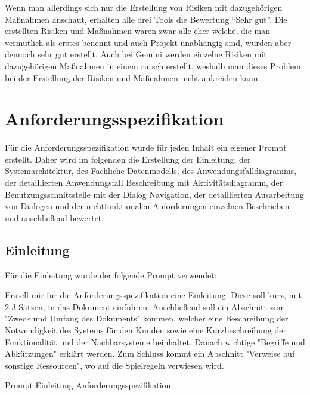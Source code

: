 Wenn man allerdings sich nur die Erstellung von Risiken mit dazugehörigen Maßnahmen anschaut, erhalten alle drei Tools die Bewertung 
``Sehr gut''. Die erstellten Risiken und Maßnahmen waren zwar alle eher welche, die man vermutlich als erstes benennt und auch 
Projekt unabhängig sind, wurden aber dennoch sehr gut erstellt. Auch bei Gemini werden einzelne Risiken mit dazugehörigen Maßnahmen 
in einem rutsch erstellt, weshalb man dieses Problem bei der Erstellung der Risiken und Maßnahmen nicht ankreiden kann.


\section{Anforderungsspezifikation}  \label{CompAnforderungsspezifikation}

Für die Anforderungsspezifikation wurde für jeden Inhalt ein eigener Prompt erstellt. Daher wird im folgenden die Erstellung der Einleitung, 
der Systemarchitektur, des Fachliche Datenmodells, des Anwendungsfalldiagramms, der detaillierten Anwendungsfall Beschreibung mit Aktivitätsdiagramm, 
der Benutzungsschnittstelle mit der Dialog Navigation, der detaillierten Ausarbeitung von Dialogen und der nichtfunktionalen Anforderungen einzelnen
Beschrieben und anschließend bewertet.\\

\subsection*{Einleitung}

Für die Einleitung wurde der folgende Prompt verwendet:

\begin{prompt}[H]
    \begin{tcolorbox}[colback=gray!20, colframe=gray!20, boxrule=0pt, sharp corners] 
        Erstell mir für die Anforderungsspezifikation eine Einleitung. Diese soll kurz, mit 2-3 Sätzen, in das Dokument einführen. Anschließend soll 
        ein Abschnitt zum "Zweck und Umfang des Dokuments" kommen, welcher eine Beschreibung der Notwendigkeit des Systems für den Kunden sowie eine 
        Kurzbeschreibung der Funktionalität und der Nachbarsysteme beinhaltet. Danach wichtige "Begriffe und Abkürzungen" erklärt werden. Zum Schluss 
        kommt ein Abschnitt "Verweise auf sonstige Ressourcen", wo auf die Spielregeln verwiesen wird.
        \vfill
    \end{tcolorbox}
    \caption{Prompt Einleitung Anforderungsspezifikation}
    \label{Prompt Einleitung Anforderungsspezifikation}
\end{prompt}

